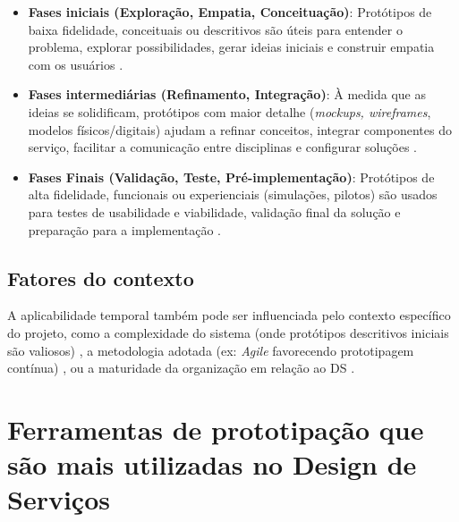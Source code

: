 \begin{itemize}
	\item \textbf{Fases iniciais (Exploração, Empatia, Conceituação)}: Protótipos de baixa fidelidade, conceituais ou descritivos são úteis para entender o problema, explorar possibilidades, gerar ideias iniciais e construir empatia com os usuários \cite{soto2023prototyping, paust2025integrative, mager2023product, lee2023industry, dehmel2021weather, lambe2022capabilities, seko2024transitions}.
	
	\item \textbf{Fases intermediárias (Refinamento, Integração)}: À medida que as ideias se solidificam, protótipos com maior detalhe (\textit{mockups, wireframes}, modelos físicos/digitais) ajudam a refinar conceitos, integrar componentes do serviço, facilitar a comunicação entre disciplinas e configurar soluções \cite{iriarte2023service, nguyen2022human, villa2022integratedcare, Kim2024, milton2021eatingdisorders}.
	
	\item \textbf{Fases Finais (Validação, Teste, Pré-implementação)}: Protótipos de alta fidelidade, funcionais ou experienciais (simulações, pilotos) são usados para testes de usabilidade e viabilidade, validação final da solução e preparação para a implementação \cite{asbjornsen2022echange, villa2022integratedcare, seko2024transitions, yan2022pssvalue}.
\end{itemize}

\subsection{Fatores do contexto}

A aplicabilidade temporal também pode ser influenciada pelo contexto específico do projeto, como a complexidade do sistema (onde protótipos descritivos iniciais são valiosos) \cite{lee2023industry}, a metodologia adotada (ex: \textit{Agile} favorecendo prototipagem contínua) \cite{soto2023prototyping}, ou a maturidade da organização em relação ao DS \cite{soto2023prototyping}.




\section{Ferramentas de prototipação que são mais utilizadas no Design de Serviços}

